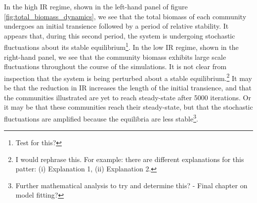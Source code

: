 \begin{itemize}
In the high IR regime, shown in the left-hand panel of figure \ref{fig:total_biomass_dynamics}, we see that the total biomass of each community undergoes an initial transience followed by a period of relative stability. It appears that, during this second period, the system is undergoing stochastic fluctuations about its stable equilibrium\footnote{Test for this?}. In the low IR regime, shown in the right-hand panel, we see that the community biomass exhibits large scale fluctuations throughout the course of the simulations. It is not clear from inspection that the system is being perturbed about a stable equilibrium.\footnote{I would rephrase this. For example: there are different explanations for this patter: (i) Explanation 1, (ii) Explanation 2.} It may be that the reduction in IR increases the length of the initial transience, and that the communities illustrated are yet to reach steady-state after 5000 iterations. Or it may be that these communities reach their steady-state, but that the stochastic fluctuations are amplified because the equilibria are less stable\footnote{Further mathematical analysis to try and determine this? - Final chapter on model fitting?}. 


\end{itemize}
